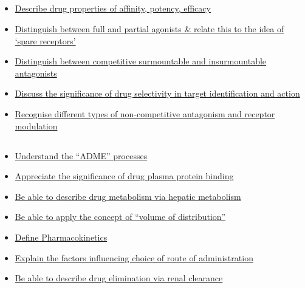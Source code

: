 \documentclass[10pt, a4paper]{article}
\begin{document}
\subsection{} \begin{itemize} \item \href{https://www.notion.so/83b91a543d4a491bb919b6ba67149834}{Describe drug properties of affinity, potency, efficacy } \item \href{https://www.notion.so/8484eb7d2333475584df9b47d0c4b1ff}{Distinguish between full and partial agonists \& relate this to the idea of ‘spare receptors’} \item \href{https://www.notion.so/8210e9c8e5fa4180839a888dc00c3be6}{Distinguish between competitive surmountable and insurmountable antagonists} \item \href{https://www.notion.so/a8c0afb80ec04aa3af324fa825511cc0}{Discuss the significance of drug selectivity in target identification and action} \item \href{https://www.notion.so/196a4461aba34f4b986c337adf9f6a8b}{Recognise different types of non-competitive antagonism and receptor modulation} \end{itemize}
\subsection{} \begin{itemize} \item \href{https://www.notion.so/9cdfd1ff1bcf46e685c1cb614c6ef41f}{Understand the “ADME” processes} \item \href{https://www.notion.so/2f28fc9236cd4d9991dcea2b59ad1d6f}{Appreciate the significance of drug plasma protein binding} \item \href{https://www.notion.so/c2e9e015f44b4b789abd38f33cffd360}{Be able to describe drug metabolism via hepatic metabolism} \item \href{https://www.notion.so/cab216a9c08e413d971160b7c077676f}{Be able to apply the concept of “volume of distribution”} \item \href{https://www.notion.so/f0c8c636ae19450d9f2c5ece542f0e09}{Define Pharmacokinetics} \item \href{https://www.notion.so/b6d722518b5042b5a206dd3dd475d708}{Explain the factors influencing choice of route of administration} \item \href{https://www.notion.so/158194975fd449d3a287b92c8b2ba278}{Be able to describe drug elimination via renal clearance} \end{itemize}
\end{document}
